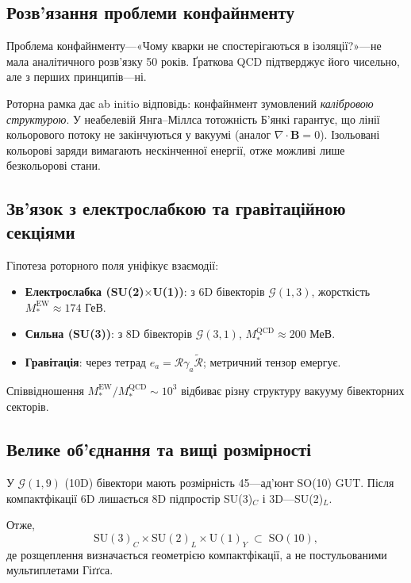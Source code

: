 \documentclass[11pt,a4paper]{article}
\newcommand{\rev}[1]{\widetilde{#1}}           %
\newcommand{\Rotor}{\mathcal{R}}
\newcommand{\Cl}{\mathcal{G}}
\newcommand{\SU}{\mathrm{SU}}
\newcommand{\UU}{\mathrm{U}}
\newcommand{\SO}{\mathrm{SO}}
\theoremstyle{definition}
\theoremstyle{plain}
\theoremstyle{remark}
\begin{document}
\subsection{Розв’язання проблеми конфайнменту}

Проблема конфайнменту—«Чому кварки не спостерігаються в ізоляції?»—не мала аналітичного розв’язку 50 років. Ґраткова QCD підтверджує його чисельно, але з перших принципів—ні.

Роторна рамка дає ab initio відповідь: конфайнмент зумовлений \emph{калібровою структурою}. У неабелевій Янга–Міллса тотожність Б’янкі гарантує, що лінії кольорового потоку не закінчуються у вакуумі (аналог $\nabla\cdot\mathbf{B}=0$). Ізольовані кольорові заряди вимагають нескінченної енергії, отже можливі лише безкольорові стани.

\subsection{Зв’язок з електрослабкою та гравітаційною секціями}

Гіпотеза роторного поля уніфікує взаємодії:
\begin{itemize}[leftmargin=*,itemsep=3pt]
  \item \textbf{Електрослабка (SU(2)$\times$U(1))}: з 6D бівекторів $\Cl(1,3)$, жорсткість $M_\ast^{\mathrm{EW}}\approx 174$ ГеВ.
  \item \textbf{Сильна (SU(3))}: з 8D бівекторів $\Cl(3,1)$, $M_\ast^{\mathrm{QCD}}\approx 200$ МеВ.
  \item \textbf{Гравітація}: через тетрад $e_a=\Rotor \gamma_a \rev{\Rotor}$; метричний тензор емергує.
\end{itemize}

Співвідношення $M_\ast^{\mathrm{EW}}/M_\ast^{\mathrm{QCD}}\sim 10^3$ відбиває різну структуру вакууму бівекторних секторів.

\subsection{Велике об’єднання та вищі розмірності}

У $\Cl(1,9)$ (10D) бівектори мають розмірність 45—ад’юнт SO(10) GUT. Після компактфікації 6D лишається 8D підпростір SU(3)$_C$ і 3D—SU(2)$_L$.

Отже,
\begin{equation}
\SU(3)_C \times \SU(2)_L \times \UU(1)_Y \;\subset\; \SO(10),
\end{equation}
де розщеплення визначається геометрією компактфікації, а не постульованими мультиплетами Гіґґса.
\end{document}

